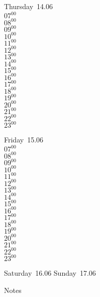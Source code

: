 \documentclass[11pt, a4paper]{book}\usepackage[]{graphicx}\usepackage[]{color}
\begin{document}
\begin{weekdaybox}
  Thursday~14.06\\
  { 
  \vfill
  $07^{00}$\\
$08^{00}$\\
$09^{00}$\\
$10^{00}$\\
$11^{00}$\\
$12^{00}$\\
$13^{00}$\\
$14^{00}$\\
$15^{00}$\\
$16^{00}$\\
$17^{00}$\\
$18^{00}$\\
$19^{00}$\\
$20^{00}$\\
$21^{00}$\\
$22^{00}$\\
$23^{00}$\\
  }
\end{weekdaybox} 
\begin{weekdaybox}
  Friday~15.06\\
  { 
  \vfill
  $07^{00}$\\
$08^{00}$\\
$09^{00}$\\
$10^{00}$\\
$11^{00}$\\
$12^{00}$\\
$13^{00}$\\
$14^{00}$\\
$15^{00}$\\
$16^{00}$\\
$17^{00}$\\
$18^{00}$\\
$19^{00}$\\
$20^{00}$\\
$21^{00}$\\
$22^{00}$\\
$23^{00}$\\
  }
\end{weekdaybox}
\begin{weekendbox}
  Saturday~16.06
  \tcblower
  Sunday~17.06
\end{weekendbox} %
\begin{notebox}
  Notes
\end{notebox}
\clearpage
\end{document}

